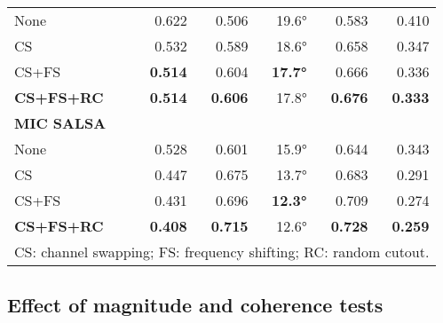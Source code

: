 \documentclass[journal]{IEEEtran}
\begin{document}
\begin{table}[t]
\begin{tabularx}{\columnwidth}{Xrrrrr}
        None            & 0.622 & 0.506 & 19.6\si{\degree} & 0.583 & 0.410 \\
        CS              & 0.532 & 0.589 & 18.6\si{\degree} & 0.658 & 0.347 \\
        CS+FS           & \bf{0.514} & 0.604 & \bf{17.7\si{\degree}} & 0.666 & 0.336 \\
        \bf{CS+FS+RC}   & \bf{0.514} & \bf{0.606} & 17.8\si{\degree} & \bf{0.676} & \bf{0.333} \\
    \midrule
    \bfseries MIC SALSA\\
    
        None            & 0.528 & 0.601 & 15.9\si{\degree} & 0.644 & 0.343 \\
        CS              & 0.447 & 0.675 & 13.7\si{\degree} & 0.683 & 0.291 \\
        CS+FS           & 0.431 & 0.696 & \bf{12.3\si{\degree}} & 0.709 & 0.274 \\
        \bf{CS+FS+RC}   & \bf{0.408} & \bf{0.715} & 12.6\si{\degree} & \bf{0.728} & \bf{0.259} \\
    \bottomrule
    \multicolumn{6}{l}{CS: channel swapping; FS: frequency shifting; RC: random cutout.}
    \end{tabularx}
    \label{tab:melspeciv_aug}
    \label{tab:linspeciv_aug}
    \label{tab:melspecgcc_aug}
    \label{tab:linspecgcc_aug}
    \label{tab:salsa_foa_aug}
    \label{tab:salsa_mic_aug}
\end{table}


\subsection{Effect of magnitude and coherence tests}
\end{document}
